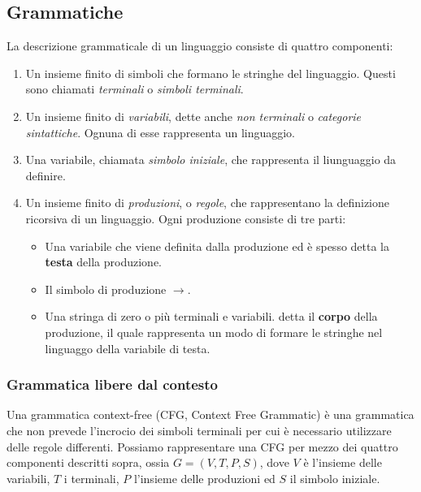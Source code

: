 \documentclass[11pt]{article}
\begin{document}
\subsection{Grammatiche}
La descrizione grammaticale di un linguaggio consiste di quattro componenti:
\begin{enumerate}
	\item Un insieme finito di simboli che formano le stringhe del linguaggio. Questi sono chiamati \textit{terminali} o \textit{simboli terminali}.
	\item Un insieme finito di \textit{variabili}, dette anche \textit{non terminali} o \textit{categorie sintattiche}. Ognuna di esse rappresenta un linguaggio.
	\item Una variabile, chiamata \textit{simbolo iniziale}, che rappresenta il liunguaggio da definire.
	\item Un insieme finito di \textit{produzioni}, o \textit{regole}, che rappresentano la definizione ricorsiva di un linguaggio. Ogni produzione consiste di tre parti:
	\begin{itemize}
		\item Una variabile che viene definita dalla produzione ed è spesso detta la \textbf{testa} della produzione.
		\item Il simbolo di produzione $\rightarrow$.
		\item Una stringa di zero o più terminali e variabili. detta il \textbf{corpo} della produzione, il quale rappresenta un modo di formare le stringhe nel linguaggo della variabile di testa. 
	\end{itemize}
\end{enumerate}
\subsubsection{Grammatica libere dal contesto}
Una grammatica context-free (CFG, Context Free Grammatic) è una grammatica che non prevede l'incrocio dei simboli terminali per cui è necessario utilizzare delle regole differenti. Possiamo rappresentare una CFG per mezzo dei quattro componenti descritti sopra, ossia $G=(V,T,P,S)$, dove $V$ è l'insieme delle variabili, $T$ i terminali, $P$ l'insieme delle produzioni ed $S$ il simbolo iniziale.
\\ \\
\end{document}
